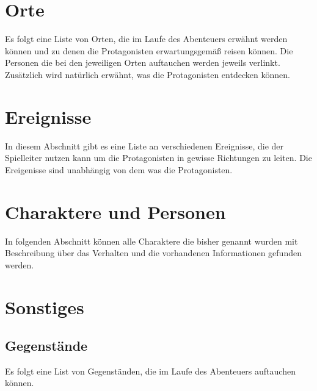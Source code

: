 \documentclass[10pt]{article}
\begin{document}
    \tableofcontents

    \newpage
    
    \newpage
    

    \newpage
    

    \newpage
    \section{Orte}
        \label{sec:locs}
        Es folgt eine Liste von Orten, die im Laufe des Abenteuers erwähnt werden können und zu denen die Protagonisten erwartungsgemäß reisen können. Die Personen die bei den jeweiligen Orten auftauchen werden jeweils verlinkt. Zusätzlich wird natürlich erwähnt, was die Protagonisten entdecken können.
        
        

    \newpage
    \section{Ereignisse}
        \label{sec:events}
        In diesem Abschnitt gibt es eine Liste an verschiedenen Ereignisse, die der Spielleiter nutzen kann um die Protagonisten in gewisse Richtungen zu leiten. Die Ereigenisse sind unabhängig von dem was die Protagonisten.

    \newpage
    \section{Charaktere und Personen}
        In folgenden Abschnitt können alle Charaktere die bisher genannt wurden mit Beschreibung über das Verhalten und die vorhandenen Informationen gefunden werden.
    
    
    

    \newpage
    \section{Sonstiges}
        
        \subsection{Gegenstände}
            Es folgt eine List von Gegenständen, die im Laufe des Abenteuers auftauchen können.
            
        
\end{document}
